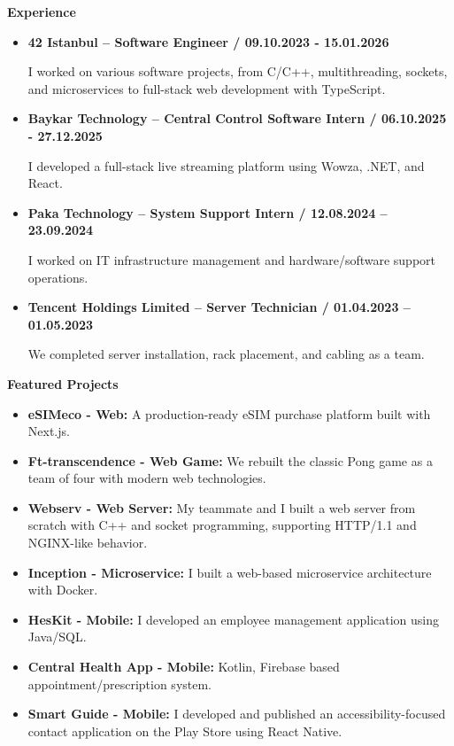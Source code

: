 \documentclass[a4paper,11pt]{article}
\begin{document}
\vspace{-0.4em}

\textbf{Experience}
\vspace{-0.5em}
\begin{itemize}

  \item \textbf{42 Istanbul – Software Engineer / 09.10.2023 - 15.01.2026}
    
    I worked on various software projects, from C/C++, multithreading, sockets, and microservices to full-stack web development with TypeScript.
  \item \textbf{Baykar Technology – Central Control Software Intern / 06.10.2025 - 27.12.2025}
  
    I developed a full-stack live streaming platform using Wowza, .NET, and React.
  
  \item \textbf{Paka Technology – System Support Intern / 12.08.2024 – 23.09.2024}
  
  I worked on IT infrastructure management and hardware/software support operations.
  
  \item \textbf{Tencent Holdings Limited – Server Technician / 01.04.2023 – 01.05.2023}
  
We completed server installation, rack placement, and cabling as a team.
\end{itemize}

\vspace{-0.4em}

\textbf{Featured Projects}
\vspace{-0.5em}
\begin{itemize}
    \item \textbf{eSIMeco - Web:} A production-ready eSIM purchase platform built with Next.js.
    \item \textbf{Ft-transcendence - Web Game:} We rebuilt the classic Pong game as a team of four with modern web technologies.
    \item \textbf{Webserv - Web Server:} My teammate and I built a web server from scratch with C++ and socket programming, supporting HTTP/1.1 and NGINX-like behavior.
  \item \textbf{Inception - Microservice:} I built a web-based microservice architecture with Docker.
    \item \textbf{HesKit - Mobile:} I developed an employee management application using Java/SQL.
    \item \textbf{Central Health App - Mobile:} Kotlin, Firebase based appointment/prescription system.
  \item \textbf{Smart Guide - Mobile:} I developed and published an accessibility-focused contact application on the Play Store using React Native.
\end{itemize}
\end{document}
